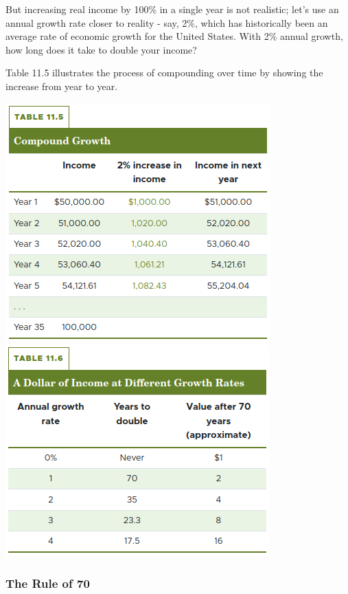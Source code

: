\documentclass[11pt]{article} %
\theoremstyle{plain}
\theoremstyle{definition}
\begin{document}
But increasing real income by 100\% in a single year is not realistic; let's use an annual growth rate closer to reality - say, 2\%, which has historically been an average rate of economic growth for the United States. With 2\% annual growth, how long does it take to double your income?

Table 11.5 illustrates the process of compounding over time by showing the increase from year to year.

\begin{center}
\includegraphics[scale=0.5]{../../images/Chapter 11/Table 11.5.png}\\
\includegraphics[scale=0.5]{../../images/Chapter 11/Table 11.6.png}
\end{center}

\subsubsection*{The Rule of 70}
\end{document}
